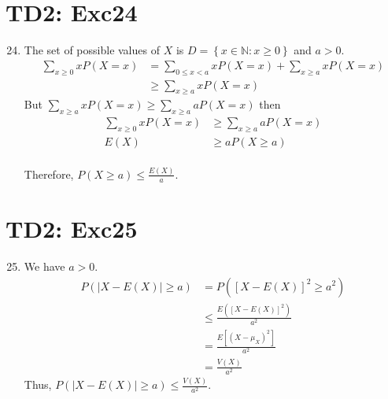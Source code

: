 \documentclass[serif,handout,t]{beamer}
\begin{document}
    \section{TD2: Exc24}
    \begin{frame}[allowframebreaks]
        \begin{enumerate}
            \setcounter{enumi}{23}
            \item The set of possible values of $ X $ is $ D=\left\{ x\in\mathbb{N}:x\geq 0 \right\} $ and $ a>0. $
            \begin{align*}
            \sum_{x\geq 0} xP(X=x) &=\sum_{0\leq x<a} xP(X=x)+\sum_{x\geq a}xP(X=x)\\
            &\geq \sum_{x\geq a}xP(X=x)
            \end{align*}
            But $ \sum_{x\geq a}xP(X=x)\geq \sum_{x\geq a}aP(X=x) $ then
            \begin{align*}
            \sum_{x\geq 0} xP(X=x) &\geq \sum_{x\geq a}aP(X=x)\\
            E(X) &\geq aP(X\geq a)
            \end{align*}\\
            Therefore, $ P(X\geq a)\leq \frac{E(X)}{a}. $
        \end{enumerate}
    \end{frame}
    \section{TD2: Exc25}
    \begin{frame}[allowframebreaks]
        \begin{enumerate}
            \setcounter{enumi}{24}
            \item We have $ a>0. $
            \begin{align*}
            P(|X-E(X)|\geq a) &=P([X-E(X)]^{2}\geq a^{2})\\
            &\leq \frac{E([X-E(X)]^{2})}{a^{2}}\\
            &=\frac{E[(X-\mu_{X})^{2}]}{a^{2}}\\
            &=\frac{V(X)}{a^{2}}
            \end{align*}
            Thus, $ P(|X-E(X)|\geq a)\leq \frac{V(X)}{a^{2}}. $
        \end{enumerate}
    \end{frame}
\end{document}
